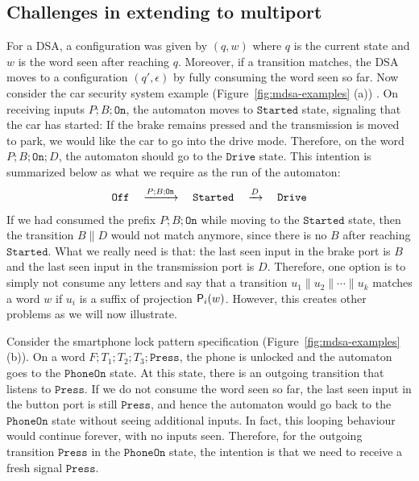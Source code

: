 \subsection{Challenges in extending to multiport}
\label{sec:challenges}

For a DSA, a configuration was given by $(q, w)$ where $q$ is the current state and $w$ is the word seen after reaching $q$. Moreover, if a transition matches, the DSA moves to a configuration $(q', \epsilon)$ by fully consuming the word seen so far. Now consider the car security system example (Figure~\ref{fig:mdsa-examples} (a)) . On receiving inputs $P;B;\mathtt{On}$, the automaton moves to $\mathtt{Started}$ state, signaling that the car has started:
If the brake remains pressed and the transmission is moved to park, we would like the car to go into the drive mode. Therefore, on the word $P;B;\mathtt{On};D$, the automaton should go to the $\mathtt{Drive}$ state. This intention is summarized below as what we require as the run of the automaton:
\begin{align*}
  \mathtt{Off} \quad \xrightarrow{P;B;\mathtt{On}} \quad \mathtt{Started} \quad \xrightarrow{D} \quad \mathtt{Drive}
  \end{align*} 
 If we had consumed the prefix $P;B;\mathtt{On}$ while moving to the $\mathtt{Started}$ state, then the transition $B \parallel D$ would not match anymore, since there is no $B$ after reaching $\mathtt{Started}$. What we really need is that: the last seen input in the brake port is $B$ and the last seen input in the transmission port is $D$. Therefore, one option is to simply not consume any letters and say that a transition $u_1 \parallel u_2 \parallel \cdots \parallel u_k$ matches a word $w$ if $u_i$ is a suffix of projection $\mathsf{P}_{i}(w)$. However, this creates other problems as we will now illustrate. 
 
 Consider the smartphone lock pattern specification (Figure~\ref{fig:mdsa-examples} (b)). On a word $F; T_1; T_2; T_3; \mathtt{Press}$, the phone is unlocked and the automaton goes to the $\mathtt{PhoneOn}$ state. At this state, there is an outgoing transition that listens to $\mathtt{Press}$. If we do not consume the word seen so far, the last seen input in the button port is still $\mathtt{Press}$, and hence the automaton would go back to the $\mathtt{PhoneOn}$ state without seeing additional inputs. In fact, this looping behaviour would continue forever, with no inputs seen. Therefore, for the outgoing transition $\mathtt{Press}$ in the $\mathtt{PhoneOn}$ state, the intention is that we need to receive a fresh signal $\mathtt{Press}$.  
 

